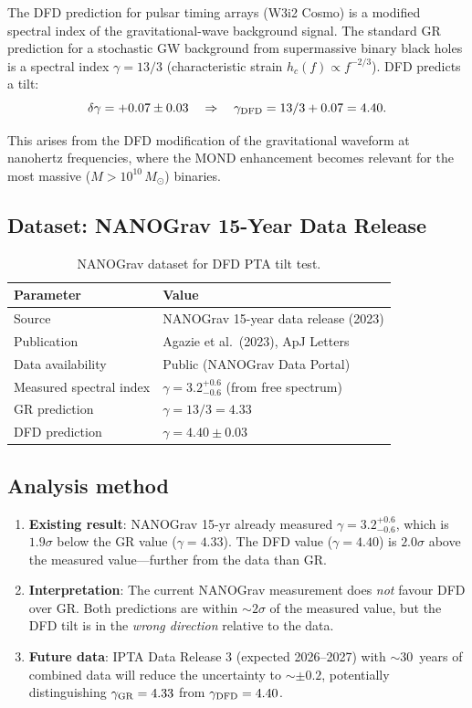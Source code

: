 \documentclass[11pt]{article}
\begin{document}
The DFD prediction for pulsar timing arrays (W3i2 Cosmo) is a modified
spectral index of the gravitational-wave background signal. The standard
GR prediction for a stochastic GW background from supermassive binary
black holes is a spectral index $\gamma = 13/3$ (characteristic strain
$h_c(f) \propto f^{-2/3}$). DFD predicts a tilt:
\begin{equation}
\delta\gamma = +0.07 \pm 0.03
\quad\Rightarrow\quad
\gamma_{\rm DFD} = 13/3 + 0.07 = 4.40.
\end{equation}

This arises from the DFD modification of the gravitational waveform
at nanohertz frequencies, where the MOND enhancement becomes relevant
for the most massive ($M > 10^{10}\,M_\odot$) binaries.

\subsection{Dataset: NANOGrav 15-Year Data Release}

\begin{table}[H]
\centering
\caption{NANOGrav dataset for DFD PTA tilt test.}
\begin{tabular}{ll}
\toprule
\textbf{Parameter} & \textbf{Value} \\
\midrule
Source & NANOGrav 15-year data release (2023) \\
Publication & Agazie et al.\ (2023), ApJ Letters \\
Data availability & Public (NANOGrav Data Portal) \\
Measured spectral index & $\gamma = 3.2^{+0.6}_{-0.6}$ (from free spectrum) \\
GR prediction & $\gamma = 13/3 = 4.33$ \\
DFD prediction & $\gamma = 4.40 \pm 0.03$ \\
\bottomrule
\end{tabular}
\end{table}

\subsection{Analysis method}

\begin{enumerate}[nosep]
\item \textbf{Existing result}: NANOGrav 15-yr already measured $\gamma
  = 3.2^{+0.6}_{-0.6}$, which is $1.9\sigma$ below the GR value
  ($\gamma = 4.33$). The DFD value ($\gamma = 4.40$) is $2.0\sigma$
  above the measured value---further from the data than GR.
\item \textbf{Interpretation}: The current NANOGrav measurement does
  \emph{not} favour DFD over GR. Both predictions are within $\sim 2\sigma$
  of the measured value, but the DFD tilt is in the \emph{wrong direction}
  relative to the data.
\item \textbf{Future data}: IPTA Data Release 3 (expected 2026--2027)
  with $\sim 30$~years of combined data will reduce the uncertainty to
  $\sim \pm 0.2$, potentially distinguishing $\gamma_{\rm GR} = 4.33$
  from $\gamma_{\rm DFD} = 4.40$.
\end{enumerate}
\end{document}
